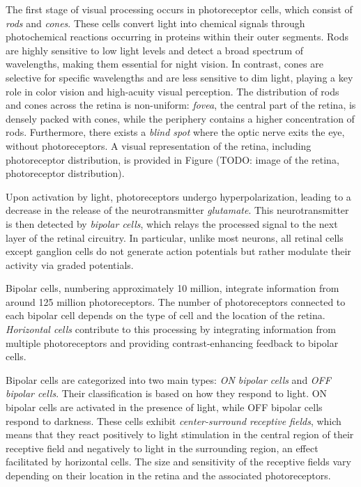 The first stage of visual processing occurs in photoreceptor cells,
which consist of \emph{rods} and \emph{cones}. These cells convert light into
chemical signals through photochemical reactions occurring in proteins within
their outer segments. Rods are highly sensitive to low light levels and detect
a broad spectrum of wavelengths, making them essential for night vision. 
In contrast, cones are selective for specific wavelengths and are less sensitive
to dim light, playing a key role in color vision and high-acuity visual perception. 
The distribution of rods and cones across the retina is non-uniform: \emph{fovea},
the central part of the retina, is densely packed with cones, while the periphery
contains a higher concentration of rods. Furthermore, there exists a \emph{blind spot} 
where the optic nerve exits the eye, without photoreceptors. A visual representation
of the retina, including photoreceptor distribution, is provided in Figure
(TODO: image of the retina, photoreceptor distribution).

Upon activation by light, photoreceptors undergo hyperpolarization, leading to a decrease
in the release of the neurotransmitter \emph{glutamate}. This neurotransmitter is then
detected by \emph{bipolar cells}, which relays the processed signal to the next layer of the
retinal circuitry. In particular, unlike most neurons, all retinal cells except ganglion
cells do not generate action potentials but rather modulate their activity via graded potentials.

Bipolar cells, numbering approximately 10 million, integrate information from around
125 million photoreceptors. The number of photoreceptors connected to each bipolar
cell depends on the type of cell and the location of the retina. \emph{Horizontal cells} contribute 
to this processing by integrating information from multiple photoreceptors and
providing contrast-enhancing feedback to bipolar cells.

Bipolar cells are categorized into two main types: \emph{ON bipolar cells} 
and \emph{OFF bipolar cells}. Their classification is based on how they 
respond to light. ON bipolar cells are activated in the presence of light, 
while OFF bipolar cells respond to darkness. These cells exhibit
\emph{center-surround receptive fields}, which means that they react positively to light
stimulation in the central region of their receptive field and negatively to
light in the surrounding region, an effect facilitated by horizontal cells. 
The size and sensitivity of the receptive fields vary depending on their location in the retina and the associated photoreceptors.

